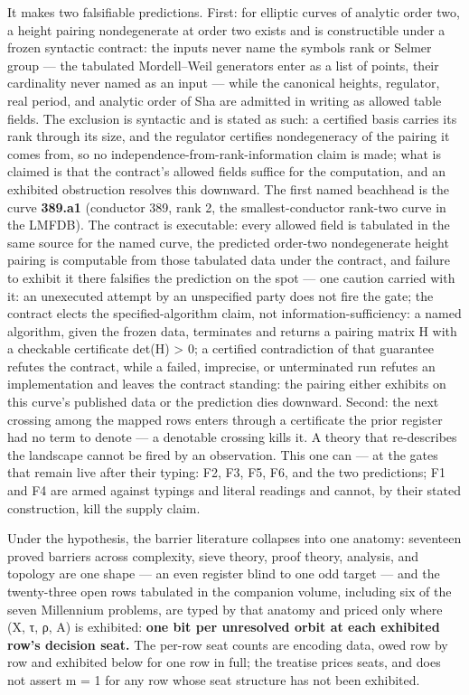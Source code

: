 \documentclass[10pt]{article}
\renewcommand{\_}{\origunderscore\allowbreak}
\begin{document}
It makes two falsifiable predictions. First: for elliptic curves of
analytic order two, a height pairing nondegenerate at order two exists
and is constructible under a frozen syntactic contract: the inputs never
name the symbols rank or Selmer group --- the tabulated Mordell--Weil
generators enter as a list of points, their cardinality never named as
an input --- while the canonical heights, regulator, real period, and
analytic order of Sha are admitted in writing as allowed table fields.
The exclusion is syntactic and is stated as such: a certified basis
carries its rank through its size, and the regulator certifies
nondegeneracy of the pairing it comes from, so no
independence-from-rank-information claim is made; what is claimed is
that the contract's allowed fields suffice for the computation, and an
exhibited obstruction resolves this downward. The first named beachhead
is the curve \textbf{389.a1} (conductor 389, rank 2, the
smallest-conductor rank-two curve in the LMFDB). The contract is
executable: every allowed field is tabulated in the same source for the
named curve, the predicted order-two nondegenerate height pairing is
computable from those tabulated data under the contract, and failure to
exhibit it there falsifies the prediction on the spot --- one caution
carried with it: an unexecuted attempt by an unspecified party does not
fire the gate; the contract elects the specified-algorithm claim, not
information-sufficiency: a named algorithm, given the frozen data,
terminates and returns a pairing matrix H with a checkable certificate
det(H) \textgreater{} 0; a certified contradiction of that guarantee
refutes the contract, while a failed, imprecise, or unterminated run
refutes an implementation and leaves the contract standing: the pairing
either exhibits on this curve's published data or the prediction dies
downward. Second: the next crossing among the mapped rows enters through
a certificate the prior register had no term to denote --- a denotable
crossing kills it. A theory that re-describes the landscape cannot be
fired by an observation. This one can --- at the gates that remain live
after their typing: F2, F3, F5, F6, and the two predictions; F1 and F4
are armed against typings and literal readings and cannot, by their
stated construction, kill the supply claim.

Under the hypothesis, the barrier literature collapses into one anatomy:
seventeen proved barriers across complexity, sieve theory, proof theory,
analysis, and topology are one shape --- an even register blind to one
odd target --- and the twenty-three open rows tabulated in the companion
volume, including six of the seven Millennium problems, are typed by
that anatomy and priced only where (X, τ, ρ, A) is exhibited:
\textbf{one bit per unresolved orbit at each exhibited row's decision
seat.} The per-row seat counts are encoding data, owed row by row and
exhibited below for one row in full; the treatise prices seats, and does
not assert m = 1 for any row whose seat structure has not been
exhibited.
\end{document}
